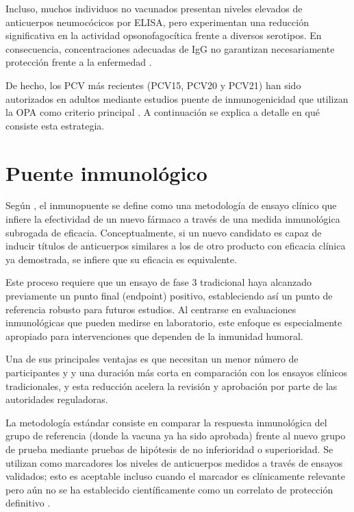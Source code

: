 Incluso, muchos individuos no vacunados presentan niveles elevados de anticuerpos neumocócicos por ELISA, pero experimentan una reducción significativa en la actividad opsonofagocítica frente a diversos serotipos. En consecuencia, concentraciones adecuadas de IgG no garantizan necesariamente protección frente a la enfermedad \cite{Westerink2012}.

De hecho, los PCV más recientes (PCV15, PCV20 y PCV21) han sido autorizados en adultos mediante estudios puente de inmunogenicidad que utilizan la OPA como criterio principal \cite{mcelwee2026overview}. A continuación se explica a detalle en qué consiste esta estrategia.

\section{Puente inmunológico}

Según \cite{cruz2025}, el inmunopuente se define como una metodología de ensayo clínico que infiere la efectividad de un nuevo fármaco a través de una medida inmunológica subrogada de eficacia. Conceptualmente, si un nuevo candidato es capaz de inducir títulos de anticuerpos similares a los de otro producto con eficacia clínica ya demostrada, se infiere que su eficacia es equivalente. 

Este proceso requiere que un ensayo de fase 3 tradicional haya alcanzado previamente un punto final (endpoint) positivo, estableciendo así un punto de referencia robusto para futuros estudios. Al centrarse en evaluaciones inmunológicas que pueden medirse en laboratorio, este enfoque es especialmente apropiado para intervenciones que dependen de la inmunidad humoral.

Una de sus principales ventajas es que necesitan un menor número de participantes y y una duración más corta en comparación con los ensayos clínicos tradicionales, y esta reducción acelera la revisión y aprobación por parte de las autoridades reguladoras.

La metodología estándar consiste en comparar la respuesta inmunológica del grupo de referencia (donde la vacuna ya ha sido aprobada) frente al nuevo grupo de prueba mediante pruebas de hipótesis de no inferioridad o superioridad. Se utilizan como marcadores los niveles de anticuerpos medidos a través de ensayos validados; esto es aceptable incluso cuando el marcador es clínicamente relevante pero aún no se ha establecido científicamente como un correlato de protección definitivo \cite{Fink2021,cruz2025}.

